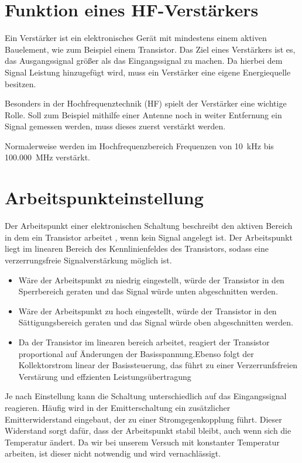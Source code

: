 \section{Funktion eines HF-Verstärkers}
Ein Verstärker ist ein elektronisches Gerät mit mindestens einem 
aktiven Bauelement, wie zum Beispiel einem Transistor.
Das Ziel eines Verstärkers ist es, das Ausgangssignal 
größer als das Eingangssignal zu machen. Da hierbei dem Signal Leistung hinzugefügt
wird, muss ein Verstärker eine eigene Energiequelle besitzen.

Besonders in der Hochfrequenztechnik (HF) spielt der Verstärker eine wichtige
Rolle. Soll zum Beispiel mithilfe einer Antenne noch in weiter Entfernung ein Signal
gemessen werden, muss dieses zuerst verstärkt werden.

Normalerweise werden im Hochfrequenzbereich Frequenzen von 10~kHz bis 100.000~MHz
verstärkt.
\clearpage

\section{Arbeitspunkteinstellung}
Der Arbeitspunkt einer elektronischen Schaltung beschreibt den aktiven Bereich in dem ein Transistor arbeitet
, wenn kein Signal angelegt ist.
Der Arbeitspunkt liegt im linearen Bereich des Kennlinienfeldes des Transistors,
sodass eine verzerrungsfreie Signalverstärkung möglich ist. 
\begin{itemize}
    \item Wäre der Arbeitspunkt zu niedrig eingestellt, würde der Transistor in den Sperrbereich geraten und das Signal würde unten abgeschnitten werden.
    \item Wäre der Arbeitspunkt zu hoch eingestellt, würde der Transistor in den Sättigungsbereich geraten und das Signal würde oben abgeschnitten werden.
    \item Da der Transistor im linearen bereich arbeitet, reagiert der Transistor proportional auf Änderungen der Basisspannung.Ebenso folgt der Kollektorstrom linear der Basissteuerung, das führt zu einer Verzerrunfsfreien Verstärung und effzienten Leistungsübertragung

\end{itemize}
Je nach Einstellung kann die Schaltung unterschiedlich auf das Eingangssignal
reagieren.
Häufig wird in der Emitterschaltung ein zusätzlicher Emitterwiderstand eingebaut, der zu einer Stromgegenkopplung führt.
Dieser Widerstand sorgt dafür, dass der Arbeitspunkt stabil bleibt, auch wenn sich die Temperatur ändert.
Da wir bei unserem Versuch mit konstanter Temperatur arbeiten, ist dieser nicht notwendig und wird vernachlässigt.

